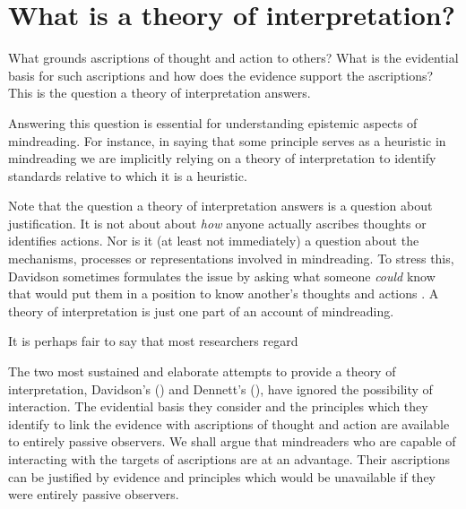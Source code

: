 \documentclass[12pt,a4paper]{extarticle}
\begin{document}
\setlength\footnotesep{1em}


\maketitle

\begin{abstract}
***
\end{abstract}


\section{What is a theory of interpretation?}
What grounds ascriptions of thought and action to others?
What is the evidential basis for such ascriptions and how does the evidence support the ascriptions?
This is the  question  a theory of interpretation answers.

Answering this question is essential for understanding epistemic aspects of mindreading.  
For instance, in saying that some principle serves as a heuristic in mindreading we are implicitly relying on a theory of interpretation to identify standards relative to which it is a heuristic.

Note that the question a theory of interpretation answers is a question about justification.
It is not about about \emph{how} anyone actually ascribes thoughts or identifies actions. 
Nor is it (at least not immediately) a question about the mechanisms, processes or representations involved in mindreading.
To stress this, Davidson sometimes formulates the issue by asking what someone \emph{could} know that would put them in a position to know another's thoughts and actions \citep[e.g.][p.\ 126]{Davidson:1973jx}.
A theory of interpretation is just one part of an account of mindreading.

It is perhaps fair to say that most researchers regard 

The two most sustained and elaborate attempts to provide a theory of interpretation,
Davidson's (\citeyear{Davidson:1984wh}) and Dennett's (\citeyear{Dennett:1987sf}),
have ignored the possibility of interaction.
The evidential basis they consider and the principles which they identify to link the evidence with ascriptions of thought and action are available to entirely passive observers.
We shall argue that mindreaders who are capable of interacting with the targets of ascriptions are at an advantage.
Their ascriptions can be justified by evidence and principles which would be unavailable if they were entirely passive observers.
\end{document}

